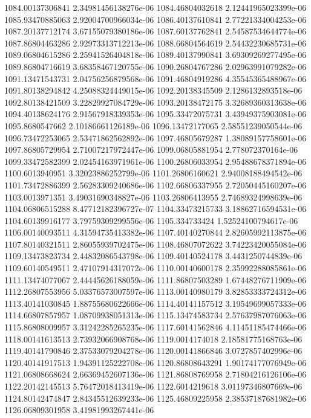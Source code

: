 {1084.00137306841 2.34981456138276e-06
1084.46804032618 2.12441965023399e-06
1085.93470885063 2.92004700966034e-06
1086.40137610841 2.77221334004253e-06
1087.20137712174 3.67155079380186e-06
1087.60137762841 2.54587534644774e-06
1087.86804463286 2.92973313712213e-06
1088.66804564619 2.54432230685731e-06
1089.06804615286 2.25941526404818e-06
1089.40137990841 3.69309269277495e-06
1089.86804716619 3.68358467120755e-06
1090.26804767286 2.02963991079282e-06
1091.13471543731 2.04756256879568e-06
1091.46804919286 4.35545365488967e-06
1091.80138294842 4.25088324449015e-06
1092.20138345509 2.1286132893518e-06
1092.80138421509 3.22829927084729e-06
1093.20138472175 3.32689360313638e-06
1094.40138624176 2.91567918339353e-06
1095.33472075731 3.43949375903081e-06
1095.8680547662 2.10186661126189e-06
1096.13472177065 2.58551239050544e-06
1096.73472253065 2.53471862562892e-06
1097.46805679287 1.38089157758601e-06
1097.86805729954 2.71007217972447e-06
1099.06805881954 2.778072370164e-06
1099.33472582399 2.02454163971961e-06
1100.26806033954 2.95488678371894e-06
1100.6013940951 3.32023886252799e-06
1101.26806160621 2.94008188494542e-06
1101.73472886399 2.56283309240686e-06
1102.66806337955 2.72050445160207e-06
1103.0013971351 3.49031690348827e-06
1103.26806413955 2.74689324998639e-06
1104.06806515288 8.47712182396727e-07
1104.33473215733 3.18862716594531e-06
1104.60139916177 3.79759309299556e-06
1105.334733424 1.52524100794617e-06
1106.00140093511 4.31594735413382e-06
1107.40140270844 2.82605992113875e-06
1107.80140321511 2.86055939702475e-06
1108.46807072622 3.74223420055084e-06
1109.13473823734 2.44832086543798e-06
1109.40140524178 3.4431250744839e-06
1109.60140549511 2.47107914317072e-06
1110.00140600178 2.35992288085861e-06
1111.13474077067 2.44445626188059e-06
1111.86807503289 1.67448276711909e-06
1112.26807553956 5.03376573007597e-06
1113.00140980179 3.82853333724312e-06
1113.40141030845 1.88755680622666e-06
1114.40141157512 3.19549699057333e-06
1114.66807857957 1.08709938051313e-06
1115.13474583734 2.57637987076063e-06
1115.86808009957 3.31242285265235e-06
1117.60141562846 4.11451185474466e-06
1118.00141613513 2.73932066908768e-06
1119.0014174018 2.18581775168763e-06
1119.40141790846 2.37533079204278e-06
1120.00141866846 3.0727857402996e-06
1120.40141917513 1.94391125222708e-06
1120.86808643291 1.90174177076949e-06
1121.06808668624 2.66369452607136e-06
1121.86808769958 2.71804216126106e-06
1122.20142145513 5.76472018413419e-06
1122.6014219618 3.01197346807669e-06
1124.80142474847 2.84345512639233e-06
1125.46809225958 2.38537187681982e-06
1126.06809301958 3.41981993267441e-06
}
